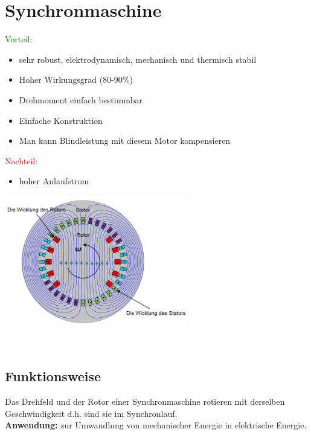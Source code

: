 \section{Synchronmaschine}
    \renewcommand{\arraystretch}{2.5} 
\begin{minipage}{0.5\linewidth}   
\textcolor{green}{Vorteil}:
\begin{itemize} 
	\item sehr robust, elektrodynamisch, mechanisch und thermisch stabil
    \item Hoher Wirkungsgrad (80-90\%)
	\item Drehmoment einfach bestimmbar
	\item Einfache Konstruktion
	\item Man kann Blindleistung mit diesem Motor kompensieren
\end{itemize}
\textcolor{red}{Nachteil}:
\begin{itemize}
\item hoher Anlaufstrom
\end{itemize}
\end{minipage}
\begin{minipage}{0.33\linewidth}
    \includegraphics[width = 8cm]{images/AufbauSynchronmotor}
\end{minipage}
\\
\subsection{Funktionsweise}
Das Drehfeld und der Rotor einer Synchronmaschine rotieren mit derselben Geschwindigkeit d.h. sind sie im Synchronlauf. \\
\textbf{Anwendung:} zur Umwandlung von mechanischer Energie in elektrische Energie.

